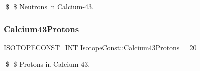 \$ \$ Neutrons in Calcium-\/43. \mbox{\label{group___isotope_const-_calcium-_ca43_gaf726ade31f4fa1966ea47a25788a1bba}} 
\subsubsection{\texorpdfstring{Calcium43\+Protons}{Calcium43Protons}}
{\footnotesize\ttfamily \mbox{\hyperlink{group___isotope_const-_macros_ga5f18360b3e99483a35c32d789e62621c}{I\+S\+O\+T\+O\+P\+E\+C\+O\+N\+S\+T\+\_\+\+I\+NT}} Isotope\+Const\+::\+Calcium43\+Protons = 20}

\$ \$ Protons in Calcium-\/43. 